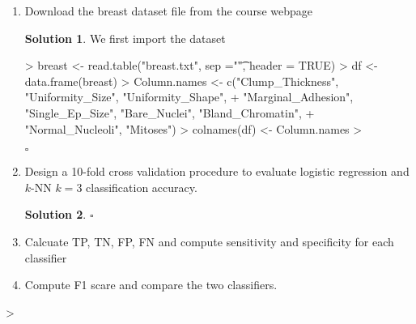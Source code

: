\documentclass[twoside]{article}
\theoremstyle{definition}
\newtheorem*{solutionT}{Solution}
\newenvironment{solution}{\begin{cBox}\begin{solutionT}}{\hfill{\scriptsize\ensuremath{\square}}\end{solutionT}\end{cBox}}
\theoremstyle{definition}
\begin{document}
\begin{enumerate}
\item Download the breast dataset file from the course webpage
\begin{solution}
We first import the dataset
\begin{Schunk}
\begin{Sinput}
> breast <- read.table("breast.txt", sep ="\t", header = TRUE)
> df <- data.frame(breast)
> Column.names <- c("Clump_Thickness", "Uniformity_Size", "Uniformity_Shape", 
+ "Marginal_Adhesion", "Single_Ep_Size", "Bare_Nuclei", "Bland_Chromatin", 
+ "Normal_Nucleoli", "Mitoses")
> colnames(df) <- Column.names
> 
\end{Sinput}
\end{Schunk}
\end{solution}
\item Design a 10-fold cross validation procedure to evaluate logistic regression and $k$-NN $k=3$ classification accuracy.
\begin{solution}

\end{solution}
\item Calcuate TP, TN, FP, FN and compute sensitivity and specificity for each classifier

\item Compute F1 scare and compare the two classifiers. 
\end{enumerate}
\begin{Schunk}
\begin{Sinput}
> 
\end{Sinput}
\end{Schunk}
\end{document}
